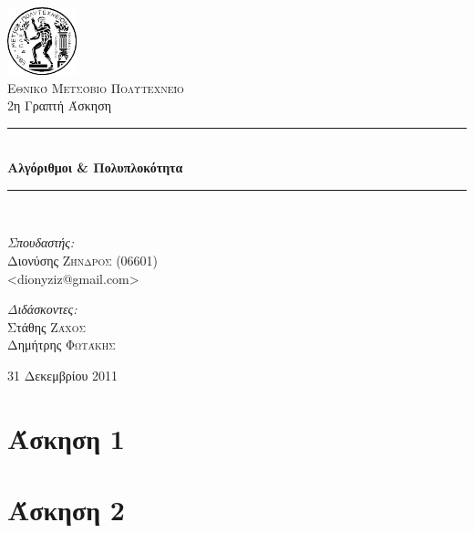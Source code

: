 \documentclass[11pt,a4paper]{book}
\newcommand{\HRule}{\rule{\linewidth}{0.5mm}}
\begin{document}
\begin{titlepage}
\begin{center}

\includegraphics[width=0.15\textwidth]{Pyrforos3.png}\\[1cm]
\textsc{\LARGE Εθνικό Μετσόβιο Πολυτεχνείο}\\[1.5cm]

\Large{ 2η Γραπτή Άσκηση }\\[0.5cm]

\begin{doublespace}
\HRule \\[0.4cm]
{\huge \bfseries
Αλγόριθμοι \& Πολυπλοκότητα
}\\[0.4cm]
\end{doublespace}

\HRule \\[1.5cm]

\begin{minipage}{0.4\textwidth}
\begin{flushleft} \large
\emph{Σπουδαστής:} \\
Διονύσης \textsc{Ζήνδρος} (06601)\\
\textlatin{\textless dionyziz@gmail.com\textgreater}
\end{flushleft}
\end{minipage}
\begin{minipage}{0.4\textwidth}
\begin{flushright} \large
\emph{Διδάσκοντες:} \\
Στάθης \textsc{Ζάχος}\\
Δημήτρης \textsc{Φωτάκης}
\end{flushright}
\end{minipage}

\vfill

{\large 31 Δεκεμβρίου 2011}
\end{center}
\end{titlepage}

\section*{Άσκηση 1}
\section*{Άσκηση 2}
\end{document}
